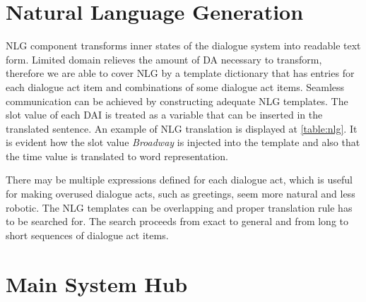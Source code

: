 \section{Natural Language Generation}

\acf{NLG} component transforms inner states of the dialogue system into readable text form.
Limited domain relieves the amount of \ac{DA} necessary to transform, therefore we are able to cover \ac{NLG} by a template dictionary that has entries for each dialogue act item and combinations of some dialogue act items.
Seamless communication can be achieved by constructing adequate \ac{NLG} templates.
The slot value of each \ac{DAI} is treated as a variable that can be inserted in the translated sentence.
An example of \ac{NLG} translation is displayed at \ref{table:nlg}.
It is evident how the slot value \textit{Broadway} is injected into the template and also that the time value is translated to word representation.

\begin{table}[h]
\centering
\small
\hspace*{-3pt}
\caption[NLG conversion of DA to sentence]{Translation example of dialogue act to sentence by Natural Language Generation component}
\label{table:nlg}
\end{table}

There may be multiple expressions defined for each dialogue act, which is useful for making overused dialogue acts, such as greetings, seem more natural and less robotic.
The \ac{NLG} templates can be overlapping and proper translation rule has to be searched for.
The search proceeds from exact to general and from long to short sequences of dialogue act items.

\section{Main System Hub}

